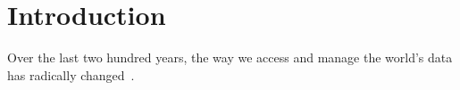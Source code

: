 \section{Introduction}

Over the last two hundred years, the way we access and manage the world's data has radically changed~\parencite{bankofengland:2016:online}.
